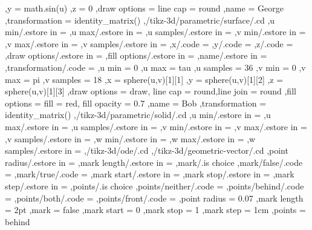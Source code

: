 {                ,y = {math.sin(u)}
                ,z = 0
                ,draw options = {line cap = round}
                ,name = George
                ,transformation = {identity_matrix()}
            ,/tikz-3d/parametric/surface/.cd %
                ,u min/.estore in = \tikz@td@p@surf@umin
                ,u max/.estore in = \tikz@td@p@surf@umax
                ,u samples/.estore in = \tikz@td@p@surf@usamples
                ,v min/.estore in = \tikz@td@p@surf@vmin
                ,v max/.estore in = \tikz@td@p@surf@vmax
                ,v samples/.estore in = \tikz@td@p@surf@vsamples
                ,x/.code = {\edef\tikz@td@p@surf@x{#1}}
                ,y/.code = {\edef\tikz@td@p@surf@y{#1}}
                ,z/.code = {\edef\tikz@td@p@surf@z{#1}}
                ,draw options/.estore in = \tikz@td@p@surf@drawoptions
                ,fill options/.estore in = \tikz@td@p@surf@filloptions
                ,name/.estore in = \tikz@td@p@surf@name
                ,transformation/.code = {\edef\tikz@td@p@surf@transformation{#1}}
                ,u min = 0
                ,u max = tau
                ,u samples = 36
                ,v min = 0
                ,v max = pi
                ,v samples = 18
                ,x = {sphere(u,v)[1][1]}
                ,y = {sphere(u,v)[1][2]}
                ,z = {sphere(u,v)[1][3]}
                ,draw options = {draw, line cap = round,line join = round}
                ,fill options = {fill = red, fill opacity = 0.7}
                ,name = Bob
                ,transformation = {identity_matrix()}
            ,/tikz-3d/parametric/solid/.cd %
                ,u min/.estore in = \tikz@td@p@s@umin
                ,u max/.estore in = \tikz@td@p@s@umax
                ,u samples/.estore in = \tikz@td@p@s@usamples
                ,v min/.estore in = \tikz@td@p@s@vmin
                ,v max/.estore in = \tikz@td@p@s@vmax
                ,v samples/.estore in = \tikz@td@p@s@vsamples
                ,w min/.estore in = \tikz@td@p@s@wmin
                ,w max/.estore in = \tikz@td@p@s@wmax
                ,w samples/.estore in = \tikz@td@p@s@wsamples
        ,/tikz-3d/ode/.cd %
        ,/tikz-3d/geometric-vector/.cd %
            ,point radius/.estore in = \tikz@td@gm@pointradius
            ,mark length/.estore in = \tikz@td@gm@marklength
            ,mark/.is choice 
                ,mark/false/.code = {\edef\tikz@td@gm@mark{0}}
                ,mark/true/.code = {\edef\tikz@td@gm@mark{1}}
            ,mark start/.estore in = \tikz@td@gm@markstart
            ,mark stop/.estore in = \tikz@td@gm@markstop
            ,mark step/.estore in = \tikz@td@gm@markstep
            ,points/.is choice 
                ,points/neither/.code = {\edef\tikz@td@gm@points{0}}
                ,points/behind/.code = {\edef\tikz@td@gm@points{1}}
                ,points/both/.code = {\edef\tikz@td@gm@points{2}}
                ,points/front/.code = {\edef\tikz@td@gm@points{3}}
            ,point radius = 0.07
            ,mark length = 2pt
            ,mark = false
            ,mark start = 0
            ,mark stop = 1
            ,mark step = 1cm
            ,points = behind
}
